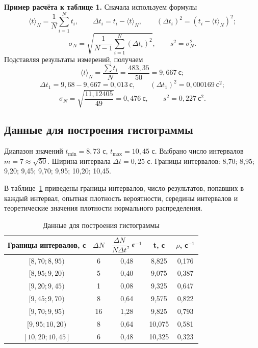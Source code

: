 \documentclass[a4paper,14pt]{extarticle}
\begin{document}
	\noindent\textbf{Пример расчёта к таблице 1.}
	Сначала используем формулы
	\[
	\langle t \rangle_N = \frac{1}{N}\sum_{i=1}^{N}t_i, \qquad
	\Delta t_i = t_i - \langle t \rangle_N, \qquad
	(\Delta t_i)^2 = \left(t_i - \langle t \rangle_N\right)^2;
	\]
	\[
	\sigma_N = \sqrt{\frac{1}{N-1}\sum_{i=1}^{N}(\Delta t_i)^2},
	\qquad s^2=\sigma_N^2.
	\]
	Подставляя результаты измерений, получаем
	\[
	\langle t \rangle_N = \frac{\sum t_i}{N} = \frac{483{,}35}{50} = 9{,}667\ \text{с};
	\]
	\[
	\Delta t_1 = 9{,}68 - 9{,}667 = 0{,}013\ \text{с}, \qquad
	(\Delta t_1)^2 = 0{,}000169\ \text{с}^2;
	\]
	\[
	\sigma_N = \sqrt{\frac{11{,}12405}{49}} = 0{,}476\ \text{с}, \qquad
	s^2 = 0{,}227\ \text{с}^2.
	\]

	\clearpage
	\subsection{Данные для построения гистограммы}
	
	Диапазон значений \(t_{\min} = 8{,}73\) с, \(t_{\max} = 10{,}45\) с.  
	Выбрано число интервалов \(m = 7 \approx \sqrt{50}\).  
	Ширина интервала \(\Delta t = 0{,}25\) с.  
	Границы интервалов: 8,70; 8,95; 9,20; 9,45; 9,70; 9,95; 10,20; 10,45.
	
	В таблице~\ref{tab:hist} приведены границы интервалов, число результатов, попавших в каждый интервал, опытная плотность вероятности, середины интервалов и теоретические значения плотности нормального распределения.
	
	\begingroup
	\renewcommand{\arraystretch}{1.6}
	\begin{table}[h!]
		\centering
		\caption{Данные для построения гистограммы}
		\label{tab:hist}
		\begin{tabular}{|c|c|c|c|c|}
			\hline
			Границы интервалов, с & $\Delta N$ & $\dfrac{\Delta N}{N \Delta t}$, с$^{-1}$ & t, с & $\rho$, с$^{-1}$ \\ \hline
			$[8{,}70; 8{,}95)$ & 6  & 0,48 & 8,825 & 0,176 \\ \hline
			$[8{,}95; 9{,}20)$ & 5  & 0,40 & 9,075 & 0,387 \\ \hline
			$[9{,}20; 9{,}45)$ & 1  & 0,08 & 9,325 & 0,647 \\ \hline
			$[9{,}45; 9{,}70)$ & 8  & 0,64 & 9,575 & 0,822 \\ \hline
			$[9{,}70; 9{,}95)$ & 16 & 1,28 & 9,825 & 0,793 \\ \hline
			$[9{,}95; 10{,}20)$& 8  & 0,64 & 10,075& 0,581 \\ \hline
			$[10{,}20; 10{,}45]$& 6  & 0,48 & 10,325& 0,323 \\ \hline
		\end{tabular}
	\end{table}
	\endgroup
\end{document}
